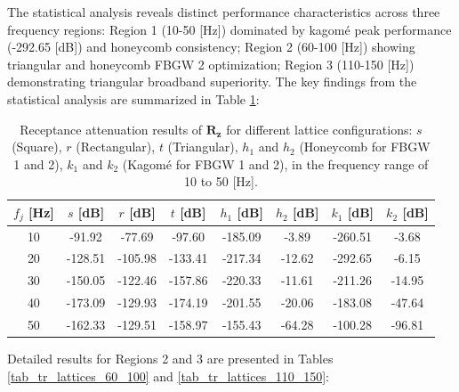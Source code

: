 \documentclass[review,numbers,sort&compress]{elsarticle}
\begin{document}
The statistical analysis reveals distinct performance characteristics across three frequency regions: Region 1 (10-50 [Hz]) dominated by kagomé peak performance (-292.65 [dB]) and honeycomb consistency; Region 2 (60-100 [Hz]) showing triangular and honeycomb FBGW 2 optimization; Region 3 (110-150 [Hz]) demonstrating triangular broadband superiority. The key findings from the statistical analysis are summarized in Table \ref{tab_tr_lattices_10_50}:
\newpage
\begin{table}[htb]
    \centering
\caption{Receptance attenuation results of $\mathbf{R_z}$ for different lattice configurations: \( s \) (Square), \( r \) (Rectangular), \( t \) (Triangular), \( h_1 \) and \( h_2 \) (Honeycomb for FBGW 1 and 2), \( k_1 \) and \( k_2 \) (Kagomé for FBGW 1 and 2), in the frequency range of 10 to 50 [Hz].}

    \begin{tabular}{cccccccc}
        $f_j$ [Hz] & $s$  [dB] & $r$  [dB] & $t$  [dB] & $h_1$ [dB] & $h_2$ [dB] & $k_1$ [dB] & $k_2$ [dB] \\ \hline
        10         & -91.92            & -77.69                  & -97.60                & -185.09                & -3.89                  & -260.51               & -3.68                \\ \hline
        20         & -128.51           & -105.98                 & -133.41               & -217.34                & -12.62                 & -292.65               & -6.15                \\ \hline
        30         & -150.05           & -122.46                 & -157.86               & -220.33                & -11.61                 & -211.26               & -14.95               \\ \hline
        40         & -173.09           & -129.93                 & -174.19               & -201.55                & -20.06                 & -183.08               & -47.64               \\ \hline
        50         & -162.33           & -129.51                 & -158.97               & -155.43                & -64.28                 & -100.28               & -96.81               \\ \hline
    \end{tabular}
    \label{tab_tr_lattices_10_50}
\end{table}

Detailed results for Regions 2 and 3 are presented in Tables \ref{tab_tr_lattices_60_100} and \ref{tab_tr_lattices_110_150}:
\end{document}
